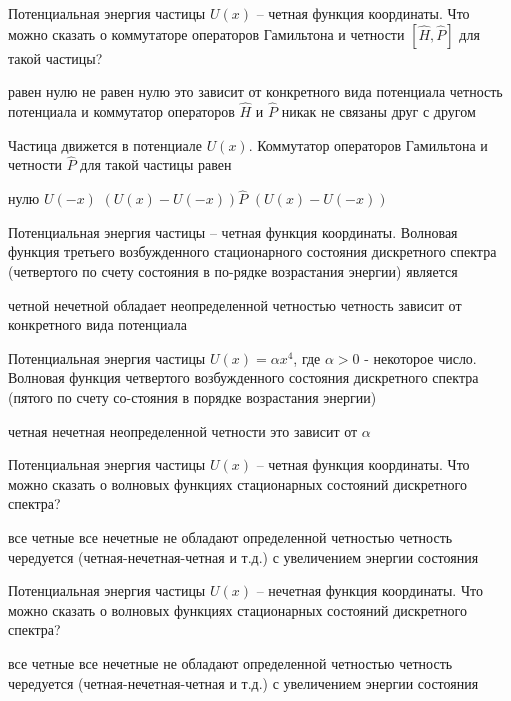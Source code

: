 \documentclass[11pt,a4paper]{exam}
\begin{document}
\begin{questions}
\question Потенциальная энергия частицы $U(x)$ – четная функция координаты. Что можно сказать о коммутаторе операторов Гамильтона и четности $\left[ {\hat H,\hat P} \right]$ для такой частицы?
\begin{choices}
\choice равен нулю
\choice не равен нулю
\choice это зависит от конкретного вида потенциала
\choice четность потенциала и коммутатор операторов $\hat H$ и $\hat P$ никак не связаны друг с другом
\end{choices}

\question Частица движется в потенциале $U(x)$. Коммутатор операторов Гамильтона и четности $\hat P$ для такой частицы равен
\begin{choices}
\choice нулю     
\choice $U( - x)$      
\choice $\left( {U(x) - U( - x)} \right)\hat P$      
\choice $\left( {U(x) - U( - x)} \right)$
\end{choices}

\question Потенциальная энергия частицы – четная функция координаты. Волновая функция третьего возбужденного стационарного состояния дискретного спектра (четвертого по счету состояния в по-рядке возрастания энергии) является
\begin{choices}
\choice четной                  
\choice нечетной
\choice обладает неопределенной четностью      
\choice четность зависит от конкретного вида потенциала
\end{choices}

\question Потенциальная энергия частицы $U(x) = \alpha {x^4}$, где $\alpha  > 0$ - некоторое число. Волновая функция четвертого возбужденного состояния дискретного спектра (пятого по счету со-стояния в порядке возрастания энергии)
\begin{choices}
\choice четная      
\choice нечетная    
\choice неопределенной четности 
\choice это зависит от $\alpha $
\end{choices}

\question Потенциальная энергия частицы $U(x)$ – четная функция координаты. Что можно сказать о волновых функциях стационарных состояний дискретного спектра?
\begin{choices}
\choice все четные  
\choice все нечетные
\choice не обладают определенной четностью
\choice четность чередуется (четная-нечетная-четная и т.д.) с увеличением энергии состояния
\end{choices}

\question Потенциальная энергия частицы $U(x)$ – нечетная функция координаты. Что можно сказать о волновых функциях стационарных состояний дискретного спектра?
\begin{choices}
\choice все четные  
\choice все нечетные
\choice не обладают определенной четностью
\choice четность чередуется (четная-нечетная-четная и т.д.) с увеличением энергии состояния
\end{choices}


\end{questions}
\end{document}
